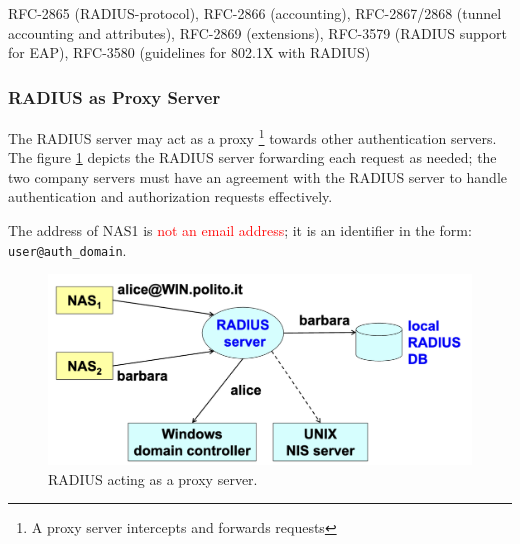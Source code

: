 \begin{tcolorbox}[colback=blue!10!white, colframe=blue!50!white, title=Request For Comments (RFC)] 
    RFC-2865 (RADIUS-protocol), RFC-2866 (accounting), RFC-2867/2868 (tunnel accounting and attributes), RFC-2869 (extensions), RFC-3579 (RADIUS support for EAP), RFC-3580 (guidelines for 802.1X with RADIUS)
\end{tcolorbox}

\subsubsection{RADIUS as Proxy Server}
The RADIUS server may act as a proxy \footnote{A proxy server intercepts and forwards requests} towards other authentication servers.
The figure \ref{fig:RADIUS_proxy} depicts the RADIUS server forwarding each request as needed; the two company servers must have an agreement with the RADIUS server to handle authentication and authorization requests effectively.

The address of NAS1 is \textcolor{red}{not an email address}; it is an identifier in the form: \texttt{user@auth\_domain}.
\begin{figure}[H]
    \includegraphics[width=\linewidth]{Images/NetSec/radiusProxy.png}
    \caption{RADIUS acting as a proxy server.}
    \label{fig:RADIUS_proxy}
\end{figure}

